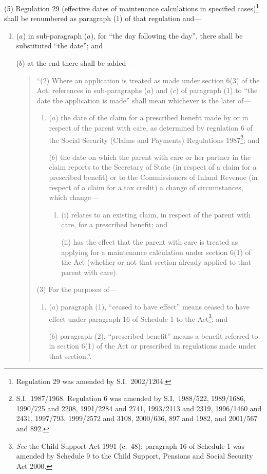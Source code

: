\documentclass[12pt,a4paper]{article}
\begin{document}
(5) Regulation 29 (effective dates of maintenance calculations in specified cases)\footnote{Regulation 29 was amended by S.I.\ 2002/1204.} shall be renumbered as paragraph (1) of that regulation and—
\begin{enumerate}\item[]
($a$) in sub-paragraph ($a$), for “the day following the day”, there shall be substituted “the date”; and

($b$) at the end there shall be added—
\begin{quotation}
“(2) Where an application is treated as made under section 6(3) of the Act, references in sub-paragraphs ($a$)  and ($c$)  of paragraph (1) to “the date the application is made” shall mean whichever is the later of—
\begin{enumerate}\item[]
($a$) the date of the claim for a prescribed benefit made by or in respect of the parent with care, as determined by regulation 6 of the Social Security (Claims and Payments) Regulations 1987\footnote{S.I.\ 1987/1968. Regulation 6 was amended by S.I.\ 1988/522, 1989/1686, 1990/725 and 2208, 1991/2284 and 2741, 1993/2113 and 2319, 1996/1460 and 2431, 1997/793, 1999/2572 and 3108, 2000/636, 897 and 1982, and 2001/567 and 892.}; and

($b$) the date on which the parent with care or her partner in the claim reports to the Secretary of State (in respect of a claim for a prescribed benefit) or to the Commissioners of Inland Revenue (in respect of a claim for a tax credit) a change of circumstances, which change—
\begin{enumerate}\item[]
(i) relates to an existing claim, in respect of the parent with care, for a prescribed benefit; and

(ii) has the effect that the parent with care is treated as applying for a maintenance calculation under section 6(1) of the Act (whether or not that section already applied to that parent with care).
\end{enumerate}
\end{enumerate}

(3) For the purposes of—
\begin{enumerate}\item[]
($a$) paragraph (1), “ceased to have effect” means ceased to have effect under paragraph 16 of Schedule 1 to the Act\footnote{\emph{See} the Child Support Act 1991 (c.\ 48); paragraph 16 of Schedule 1 was amended by Schedule 9 to the Child Support, Pensions and Social Security Act 2000.}; and

($b$) paragraph (2), “prescribed benefit” means a benefit referred to in section 6(1) of the Act or prescribed in regulations made under that section.”.
\end{enumerate}
\end{quotation}
\end{enumerate}
\end{document}
